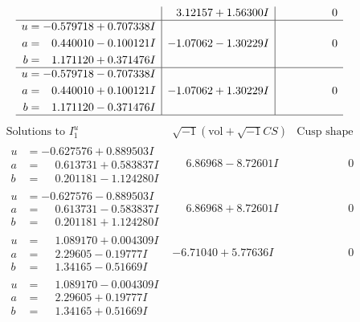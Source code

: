 \documentclass[1p]{elsarticle_modified}
\theoremstyle{definition}
\newcommand{\I}{\sqrt{-1}}
\begin{document}
$$\begin{array}{c|c|c}
 & \phantom{-}3.12157 + 1.56300 I & \phantom{-0.000000 } 0 \\ \hline\begin{aligned}
u &= -0.579718 + 0.707338 I \\
a &= \phantom{-}0.440010 - 0.100121 I \\
b &= \phantom{-}1.171120 + 0.371476 I\end{aligned}
 & -1.07062 - 1.30229 I & \phantom{-0.000000 } 0 \\ \hline\begin{aligned}
u &= -0.579718 - 0.707338 I \\
a &= \phantom{-}0.440010 + 0.100121 I \\
b &= \phantom{-}1.171120 - 0.371476 I\end{aligned}
 & -1.07062 + 1.30229 I & \phantom{-0.000000 } 0\\
 \hline 
 \end{array}$$\newpage$$\begin{array}{c|c|c}  
\text{Solutions to }I^u_{1}& \I (\text{vol} + \sqrt{-1}CS) & \text{Cusp shape}\\
 \hline 
\begin{aligned}
u &= -0.627576 + 0.889503 I \\
a &= \phantom{-}0.613731 + 0.583837 I \\
b &= \phantom{-}0.201181 - 1.124280 I\end{aligned}
 & \phantom{-}6.86968 - 8.72601 I & \phantom{-0.000000 } 0 \\ \hline\begin{aligned}
u &= -0.627576 - 0.889503 I \\
a &= \phantom{-}0.613731 - 0.583837 I \\
b &= \phantom{-}0.201181 + 1.124280 I\end{aligned}
 & \phantom{-}6.86968 + 8.72601 I & \phantom{-0.000000 } 0 \\ \hline\begin{aligned}
u &= \phantom{-}1.089170 + 0.004309 I \\
a &= \phantom{-}2.29605 - 0.19777 I \\
b &= \phantom{-}1.34165 - 0.51669 I\end{aligned}
 & -6.71040 + 5.77636 I & \phantom{-0.000000 } 0 \\ \hline\begin{aligned}
u &= \phantom{-}1.089170 - 0.004309 I \\
a &= \phantom{-}2.29605 + 0.19777 I \\
b &= \phantom{-}1.34165 + 0.51669 I\end{aligned}

\end{array}$$
\end{document}
